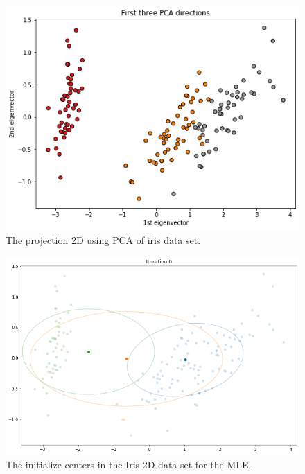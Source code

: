 \documentclass[12pt, a4paper]{paper}
\begin{document}
\begin{figure}[h!]
\centering
\includegraphics[scale=0.3]{iris_with_PCA_2_eigenvectors.png}
\caption{The projection 2D using PCA of iris data set.}
\label{fig:iris_PCA_1}
\end{figure}

\begin{figure}[h!]
\centering
\includegraphics[scale=0.3]{iris_PCA_iter_1.png}
\caption{The initialize centers in the Iris 2D data set for the MLE.}
\label{fig:iris_PCA_2}
\end{figure}
\end{document}
